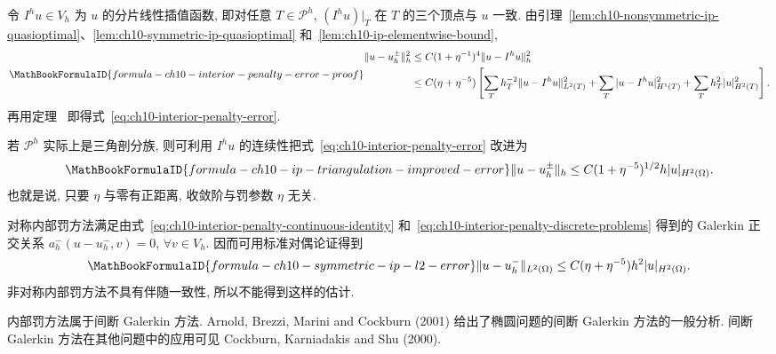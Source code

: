 \begin{Proof}
令 $I^hu\in V_h$ 为 $u$ 的分片线性插值函数, 即对任意 $T\in\mathcal P^h$, $(I^hu)|_T$ 在 $T$ 的三个顶点与 $u$ 一致. 由引理~\ref{lem:ch10-nonsymmetric-ip-quasioptimal}、\ref{lem:ch10-symmetric-ip-quasioptimal} 和~\ref{lem:ch10-ip-elementwise-bound},
\[
\MathBookFormulaID{formula-ch10-interior-penalty-error-proof}
\begin{split}
\|u-u_h^\pm\|_h^2
&\leq C(1+\eta^{-1})^4\|u-I^hu\|_h^2\\
&\leq C(\eta+\eta^{-5})\left[
\sum_T h_T^{-2}\|u-I^hu\|_{L^2(T)}^2
+\sum_T|u-I^hu|_{H^1(T)}^2
+\sum_Th_T^2|u|_{H^2(T)}^2\right].
\end{split}
\]
再用定理~ 即得式~\eqref{eq:ch10-interior-penalty-error}.
\end{Proof}

若 $\mathcal P^h$ 实际上是三角剖分族, 则可利用 $I^hu$ 的连续性把式~\eqref{eq:ch10-interior-penalty-error} 改进为
\[
\MathBookFormulaID{formula-ch10-ip-triangulation-improved-error}
\|u-u_h^\pm\|_h\leq C(1+\eta^{-5})^{1/2}h|u|_{H^2(\Omega)}.
\]
也就是说, 只要 $\eta$ 与零有正距离, 收敛阶与罚参数 $\eta$ 无关.

对称内部罚方法满足由式~\eqref{eq:ch10-interior-penalty-continuous-identity} 和~\eqref{eq:ch10-interior-penalty-discrete-problems} 得到的 Galerkin 正交关系 $a_h^-(u-u_h^-,v)=0$, $\forall v\in V_h$. 因而可用标准对偶论证得到
\begin{equation}
\MathBookFormulaID{formula-ch10-symmetric-ip-l2-error}
\label{eq:ch10-symmetric-ip-l2-error}
\|u-u_h^-\|_{L^2(\Omega)}\leq C(\eta+\eta^{-5})h^2|u|_{H^2(\Omega)}.
\end{equation}
非对称内部罚方法不具有伴随一致性, 所以不能得到这样的估计.

\begin{Remark}
\label{rem:ch10-discontinuous-galerkin}
内部罚方法属于间断 Galerkin 方法. Arnold, Brezzi, Marini and Cockburn (2001) 给出了椭圆问题的间断 Galerkin 方法的一般分析. 间断 Galerkin 方法在其他问题中的应用可见 Cockburn, Karniadakis and Shu (2000).
\end{Remark}
